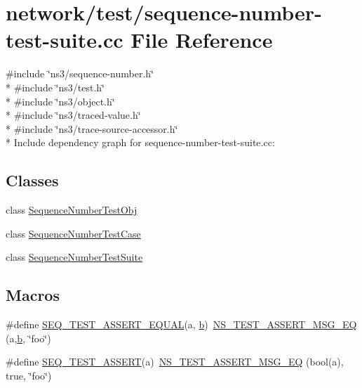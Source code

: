 \hypertarget{sequence-number-test-suite_8cc}{}\section{network/test/sequence-\/number-\/test-\/suite.cc File Reference}
\label{sequence-number-test-suite_8cc}
{\ttfamily \#include \char`\"{}ns3/sequence-\/number.\+h\char`\"{}}\\*
{\ttfamily \#include \char`\"{}ns3/test.\+h\char`\"{}}\\*
{\ttfamily \#include \char`\"{}ns3/object.\+h\char`\"{}}\\*
{\ttfamily \#include \char`\"{}ns3/traced-\/value.\+h\char`\"{}}\\*
{\ttfamily \#include \char`\"{}ns3/trace-\/source-\/accessor.\+h\char`\"{}}\\*
Include dependency graph for sequence-\/number-\/test-\/suite.cc\+:
\subsection*{Classes}
\begin{DoxyCompactItemize}
\item 
class \hyperlink{classSequenceNumberTestObj}{Sequence\+Number\+Test\+Obj}
\item 
class \hyperlink{classSequenceNumberTestCase}{Sequence\+Number\+Test\+Case}
\item 
class \hyperlink{classSequenceNumberTestSuite}{Sequence\+Number\+Test\+Suite}
\end{DoxyCompactItemize}
\subsection*{Macros}
\begin{DoxyCompactItemize}
\item 
\#define \hyperlink{sequence-number-test-suite_8cc_a406e684f8ee1fd1d725d8f96966ec9ff}{S\+E\+Q\+\_\+\+T\+E\+S\+T\+\_\+\+A\+S\+S\+E\+R\+T\+\_\+\+E\+Q\+U\+AL}(a,  \hyperlink{lte__pathloss_8m_a21ad0bd836b90d08f4cf640b4c298e7c}{b})~\hyperlink{group__testing_ga2a9d78cffb3db8e867c35fff0b698cf5}{N\+S\+\_\+\+T\+E\+S\+T\+\_\+\+A\+S\+S\+E\+R\+T\+\_\+\+M\+S\+G\+\_\+\+EQ} (a,\hyperlink{lte__pathloss_8m_a21ad0bd836b90d08f4cf640b4c298e7c}{b}, \char`\"{}foo\char`\"{})
\item 
\#define \hyperlink{sequence-number-test-suite_8cc_a6fa0724417167ff8a5aee24421cc7c44}{S\+E\+Q\+\_\+\+T\+E\+S\+T\+\_\+\+A\+S\+S\+E\+RT}(a)~\hyperlink{group__testing_ga2a9d78cffb3db8e867c35fff0b698cf5}{N\+S\+\_\+\+T\+E\+S\+T\+\_\+\+A\+S\+S\+E\+R\+T\+\_\+\+M\+S\+G\+\_\+\+EQ} (bool(a), true, \char`\"{}foo\char`\"{})
\end{DoxyCompactItemize}
